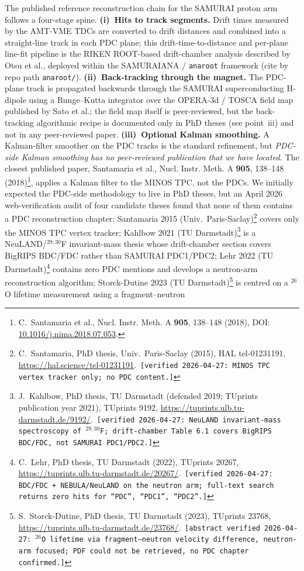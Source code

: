 \documentclass[a4paper, 11pt]{article}
\begin{document}
The published reference reconstruction chain for the SAMURAI proton arm follows a four-stage spine. \textbf{(i)~Hits to track segments.} Drift times measured by the AMT-VME TDCs are converted to drift distances and combined into a straight-line track in each PDC plane; this drift-time-to-distance and per-plane line-fit pipeline is the RIKEN ROOT-based drift-chamber analysis described by Otsu et al., deployed within the SAMURAIANA / \texttt{anaroot} framework (cite by repo path \texttt{anaroot/}). \textbf{(ii)~Back-tracking through the magnet.} The PDC-plane track is propagated backwards through the SAMURAI superconducting H-dipole using a Runge--Kutta integrator over the OPERA-3d / TOSCA field map published by Sato et al.; the field map itself is peer-reviewed, but the back-tracking algorithmic recipe is documented only in PhD theses (see point~iii) and not in any peer-reviewed paper. \textbf{(iii)~Optional Kalman smoothing.} A Kalman-filter smoother on the PDC tracks is the standard refinement, but \emph{PDC-side Kalman smoothing has no peer-reviewed publication that we have located.} The closest published paper, Santamaria et al., Nucl. Instr. Meth. A \textbf{905}, 138--148 (2018)\footnote{\label{fn:santamaria2018}C.~Santamaria et al., Nucl. Instr. Meth. A \textbf{905}, 138--148 (2018), DOI: \href{https://doi.org/10.1016/j.nima.2018.07.053}{10.1016/j.nima.2018.07.053}.}, applies a Kalman filter to the MINOS TPC, not the PDCs. We initially expected the PDC-side methodology to live in PhD theses, but an April 2026 web-verification audit of four candidate theses found that none of them contains a PDC reconstruction chapter: Santamaria 2015 (Univ.\ Paris-Saclay)\footnote{\label{fn:santamaria2015phd}C.~Santamaria, PhD thesis, Univ.\ Paris-Saclay (2015), HAL tel-01231191, \url{https://hal.science/tel-01231191}.\ \texttt{[verified 2026-04-27: MINOS TPC vertex tracker only; no PDC content.]}} covers only the MINOS TPC vertex tracker; Kahlbow 2021 (TU Darmstadt)\footnote{\label{fn:kahlbow2019}J.~Kahlbow, PhD thesis, TU Darmstadt (defended 2019; TUprints publication year 2021), TUprints 9192, \url{https://tuprints.ulb.tu-darmstadt.de/9192/}.\ \texttt{[verified 2026-04-27: NeuLAND invariant-mass spectroscopy of $^{29,30}$F; drift-chamber Table~6.1 covers BigRIPS BDC/FDC, not SAMURAI PDC1/PDC2.]}} is a NeuLAND/$^{29,30}$F invariant-mass thesis whose drift-chamber section covers BigRIPS BDC/FDC rather than SAMURAI PDC1/PDC2; Lehr 2022 (TU Darmstadt)\footnote{\label{fn:lehr2023phd}C.~Lehr, PhD thesis, TU Darmstadt (2022), TUprints 20267, \url{https://tuprints.ulb.tu-darmstadt.de/20267/}.\ \texttt{[verified 2026-04-27: BDC/FDC + NEBULA/NeuLAND on the neutron arm; full-text search returns zero hits for ``PDC'', ``PDC1'', ``PDC2''.]}} contains zero PDC mentions and develops a neutron-arm reconstruction algorithm; Storck-Dutine 2023 (TU Darmstadt)\footnote{\label{fn:storck2023phd}S.~Storck-Dutine, PhD thesis, TU Darmstadt (2023), TUprints 23768, \url{https://tuprints.ulb.tu-darmstadt.de/23768/}.\ \texttt{[abstract verified 2026-04-27: $^{26}$O lifetime via fragment--neutron velocity difference, neutron-arm focused; PDF could not be retrieved, no PDC chapter confirmed.]}} is centred on a $^{26}$O lifetime measurement using a fragment--neutron 
\end{document}
